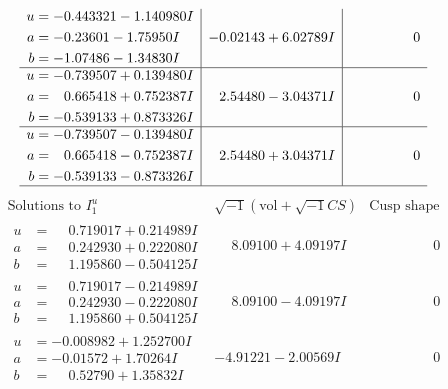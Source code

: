 \documentclass[1p]{elsarticle_modified}
\theoremstyle{definition}
\newcommand{\I}{\sqrt{-1}}
\begin{document}
$$\begin{array}{c|c|c}
\begin{aligned}
u &= -0.443321 - 1.140980 I \\
a &= -0.23601 - 1.75950 I \\
b &= -1.07486 - 1.34830 I\end{aligned}
 & -0.02143 + 6.02789 I & \phantom{-0.000000 } 0 \\ \hline\begin{aligned}
u &= -0.739507 + 0.139480 I \\
a &= \phantom{-}0.665418 + 0.752387 I \\
b &= -0.539133 + 0.873326 I\end{aligned}
 & \phantom{-}2.54480 - 3.04371 I & \phantom{-0.000000 } 0 \\ \hline\begin{aligned}
u &= -0.739507 - 0.139480 I \\
a &= \phantom{-}0.665418 - 0.752387 I \\
b &= -0.539133 - 0.873326 I\end{aligned}
 & \phantom{-}2.54480 + 3.04371 I & \phantom{-0.000000 } 0\\
 \hline 
 \end{array}$$\newpage$$\begin{array}{c|c|c}  
\text{Solutions to }I^u_{1}& \I (\text{vol} + \sqrt{-1}CS) & \text{Cusp shape}\\
 \hline 
\begin{aligned}
u &= \phantom{-}0.719017 + 0.214989 I \\
a &= \phantom{-}0.242930 + 0.222080 I \\
b &= \phantom{-}1.195860 - 0.504125 I\end{aligned}
 & \phantom{-}8.09100 + 4.09197 I & \phantom{-0.000000 } 0 \\ \hline\begin{aligned}
u &= \phantom{-}0.719017 - 0.214989 I \\
a &= \phantom{-}0.242930 - 0.222080 I \\
b &= \phantom{-}1.195860 + 0.504125 I\end{aligned}
 & \phantom{-}8.09100 - 4.09197 I & \phantom{-0.000000 } 0 \\ \hline\begin{aligned}
u &= -0.008982 + 1.252700 I \\
a &= -0.01572 + 1.70264 I \\
b &= \phantom{-}0.52790 + 1.35832 I\end{aligned}
 & -4.91221 - 2.00569 I & \phantom{-0.000000 } 0 \\ \hline\begin{aligned}

\end{aligned}
\end{array}$$
\end{document}
